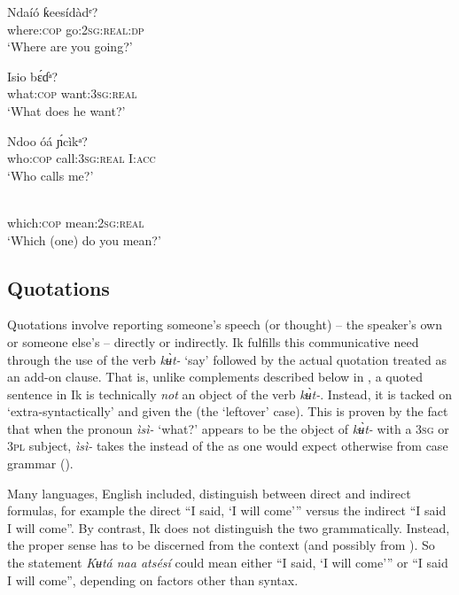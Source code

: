 \ea\label{ex:syn:48}
\gll Ndaíó   ƙeesídàdᵉ? \\
where:\textsc{cop}   go:\textsc{2sg:real:dp}    \\
\glt ‘Where are you going?’ 
\z




\ea\label{ex:syn:49}
\gll Isio     b\'{ɛ}ɗᵃ? \\
what:\textsc{cop}   want:\textsc{3sg:real}    \\
\glt ‘What does he want?’ 
\z




\ea\label{ex:syn:50}
\gll Ndoo     óá       \'{ɲ}cìkᵃ? \\
who:\textsc{cop}   call:\textsc{3sg:real}   I:\textsc{acc}    \\
\glt ‘Who calls me?’ 
\z




\ea\label{ex:syn:51}
 \\
which:\textsc{cop}   mean:\textsc{2sg:real}    \\
\glt ‘Which (one) do you mean?’ 
\z






\subsection{Quotations}\label{sec:10.5}


Quotations involve reporting someone’s speech (or thought) – the speaker’s own or someone else’s – directly or indirectly. Ik fulfills this communicative need through the use of the verb \textit{k\`{ʉ}t-} ‘say’ followed by the actual quotation treated as an add-on clause. That is, unlike complements described below in , a quoted sentence in Ik is technically \textit{not} an object of the verb \textit{k\`{ʉ}t-}. Instead, it is tacked on ‘extra-syntactically’ and given the  (the ‘leftover’ case). This is proven by the fact that when the pronoun \textit{ìsì-} ‘what?’ appears to be the object of \textit{k\`{ʉ}t-} with a \textsc{3sg} or \textsc{3pl} subject, \textit{ìsì-} takes the  instead of the  as one would expect otherwise from case grammar ().

Many languages, English included, distinguish between direct and indirect  formulas, for example the direct “I said, ‘I will come’” versus the indirect “I said I will come”. By contrast, Ik does not distinguish the two grammatically. Instead, the proper sense has to be discerned from the context (and possibly from ). So the statement \textit{Kʉt{\Í}á naa atsésí} could mean either “I said, ‘I will come’” or “I said I will come”, depending on factors other than syntax. 

